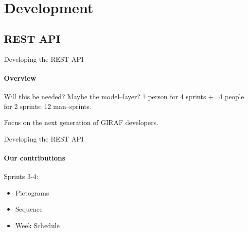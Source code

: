 \section{Development}
    \subsection{REST API}
        \begin{frame}[t]{Developing the REST API}\framesubtitle{Overview}
            Will this be needed?
            Maybe the model--layer?
            1 person for 4 sprints + ~4 people for 2 sprints:
            12 man--sprints.

            Focus on the next generation of GIRAF developers. 
        \end{frame}

        \begin{frame}[t]{Developing the REST API}\framesubtitle{Our contributions}
            Sprints 3-4:
            \begin{itemize}
                \item Pictograms
                \item Sequence
                \item Week Schedule
            \end{itemize}
            \bigskip
        \end{frame}

